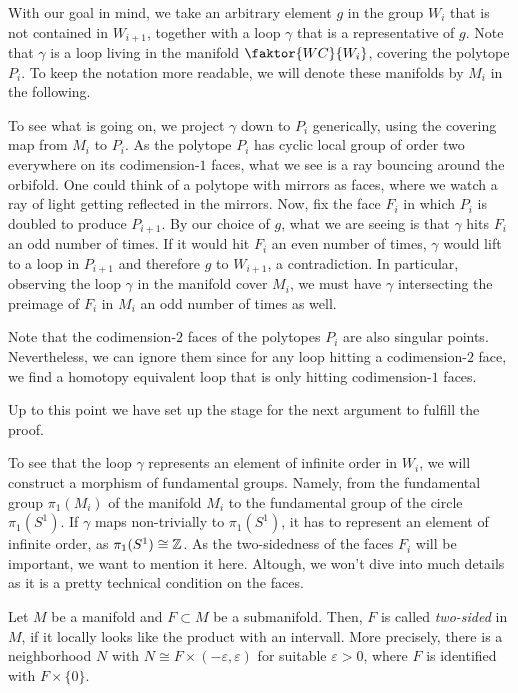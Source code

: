 With our goal in mind, we take an arbitrary element \(g\) in the group \(W_i\) that is not contained in \(W_{i+1}\), together with a loop \(\gamma\) that is a representative of \(g\).
Note that \(\gamma\) is a loop living in the manifold \(\faktor{WC}{W_i}\), covering the polytope \(P_i\).
To keep the notation more readable, we will denote these manifolds by \(M_i\) in the following.

\noindent
To see what is going on, we project \(\gamma\) down to \(P_i\) generically, using the covering map from \(M_i\) to \(P_i\).
As the polytope \(P_i\) has cyclic local group of order two everywhere on its codimension-\(1\) faces, what we see is a ray bouncing around the orbifold. %
One could think of a polytope with mirrors as faces, where we watch a ray of light getting reflected in the mirrors.
Now, fix the face \(F_i\) in which \(P_i\) is doubled to produce \(P_{i+1}\).
By our choice of \(g\), what we are seeing is that \(\gamma\) hits \(F_i\) an odd number of times.
If it would hit \(F_i\) an even number of times, \(\gamma\) would lift to a loop in \(P_{i+1}\) and therefore \(g\) to \(W_{i+1}\), a contradiction.
In particular, observing the loop \(\gamma\) in the manifold cover \(M_i\), we must have \(\gamma\) intersecting the preimage of \(F_i\) in \(M_i\) an odd number of times as well.

\begin{remark}
    Note that the codimension-\(2\) faces of the polytopes \(P_i\) are also singular points.
    Nevertheless, we can ignore them since for any loop hitting a codimension-\(2\) face, we find a homotopy equivalent loop that is only hitting codimension-\(1\) faces.
\end{remark}

Up to this point we have set up the stage for the next argument to fulfill the proof.

\noindent
To see that the loop \(\gamma\) represents an element of infinite order in \(W_i\), we will construct a morphism of fundamental groups.
Namely, from the fundamental group \(\pi_1(M_i)\) of the manifold \(M_i\) to the fundamental group of the circle \(\pi_1(S^1)\).
If \(\gamma\) maps non-trivially to \(\pi_1(S^1)\), it has to represent an element of infinite order, as \(\pi_1(S^1) \cong \mathbb{Z}\).
As the two-sidedness of the faces \(F_i\) will be important, we want to mention it here.
Altough, we won't dive into much details as it is a pretty technical condition on the faces.

\begin{definition}
    Let \(M\) be a manifold and \(F \subset M\) be a submanifold.
    Then, \(F\) is called \emph{two-sided} in \(M\), if it locally looks like the product with an intervall.
    More precisely, there is a neighborhood \(N\) with \(N \cong F \times (-\varepsilon, \varepsilon)\) for suitable \(\varepsilon > 0\), where \(F\) is identified with \(F \times \{0\}\).
\end{definition}

